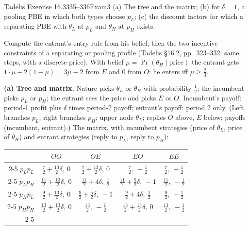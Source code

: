 \begin{exsol}{Tadelis Exercise 16.3}{335--336}{Exam}{3}
\asked (a) The tree and the matrix; (b) for $\delta = 1$, a pooling PBE in which both types choose
$p_L$; (c) the discount factors for which a separating PBE with $\theta_L$ at $p_L$ and $\theta_H$
at $p_H$ exists.

\method Compute the entrant's entry rule from his belief, then the two incentive constraints of a
separating or pooling profile (Tadelis \S16.2, pp.~323--332: same steps, with a discrete price).
With belief $\mu = \Pr(\theta_H \mid \text{price})$ the entrant gets $1\cdot\mu - 2(1-\mu) = 3\mu - 2$
from $E$ and $0$ from $O$: he enters iff $\mu \ge \frac23$.

\solution \textbf{(a) Tree and matrix.} Nature picks $\theta_L$ or $\theta_H$ with probability $\frac12$;
the incumbent picks $p_L$ or $p_H$; the entrant sees the price and picks $E$ or $O$. Incumbent's
payoff: period-1 profit plus $\delta$ times period-2 payoff; entrant's payoff: period 2 only.
(Left branches $p_L$, right branches $p_H$; upper node $\theta_L$; replies $O$ above, $E$ below;
payoffs (incumbent, entrant).) The matrix, with incumbent strategies (price of $\theta_L$, price of
$\theta_H$) and entrant strategies (reply to $p_L$, reply to $p_H$):
\begin{center}
\small
\begin{tabular}{r|c|c|c|c|}
\multicolumn{1}{r}{} & \multicolumn{1}{c}{$OO$} & \multicolumn{1}{c}{$OE$} & \multicolumn{1}{c}{$EO$} & \multicolumn{1}{c}{$EE$} \\ \cline{2-5}
$p_L p_L$ & $\frac72 + \frac{13}{2}\delta,\ 0$ & $\frac72 + \frac{13}{2}\delta,\ 0$ & $\frac72,\ -\frac12$ & $\frac72,\ -\frac12$ \\ \cline{2-5}
$p_L p_H$ & $\frac{11}{2} + \frac{13}{2}\delta,\ 0$ & $\frac{11}{2} + 4\delta,\ \frac12$ & $\frac{11}{2} + \frac52\delta,\ -1$ & $\frac{11}{2},\ -\frac12$ \\ \cline{2-5}
$p_H p_L$ & $\frac92 + \frac{13}{2}\delta,\ 0$ & $\frac92 + \frac52\delta,\ -1$ & $\frac92 + 4\delta,\ \frac12$ & $\frac92,\ -\frac12$ \\ \cline{2-5}
$p_H p_H$ & $\frac{13}{2} + \frac{13}{2}\delta,\ 0$ & $\frac{13}{2},\ -\frac12$ & $\frac{13}{2} + \frac{13}{2}\delta,\ 0$ & $\frac{13}{2},\ -\frac12$ \\ \cline{2-5}
\end{tabular}
\end{center}


\end{exsol}
